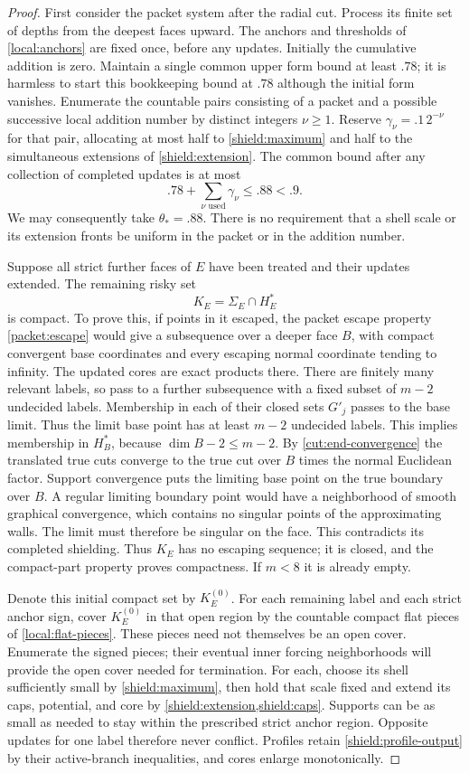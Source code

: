 \begin{proof}
First consider the packet system after the radial cut.  Process its
finite set of depths from the deepest faces upward.  The anchors and
thresholds of \cref{local:anchors} are fixed once, before any updates.
Initially the cumulative addition is zero.  Maintain a single common
upper form bound at least $.78$; it is harmless to start this bookkeeping
bound at $.78$ although the initial form vanishes.  Enumerate the
countable pairs consisting of a packet and a possible successive local
addition number by distinct integers $\nu\ge1$.  Reserve
$\gamma_\nu=.1\,2^{-\nu}$ for that pair, allocating at most half to
\cref{shield:maximum} and half to the simultaneous extensions of
\cref{shield:extension}.  The common bound after any collection of
completed updates is at most
\[
 .78+\sum_{\nu\text{ used}}\gamma_\nu\le .88<.9.
\]
We may consequently take $\theta_*=.88$.  There is no requirement
that a shell scale or its extension fronts be uniform in the packet
or in the addition number.

Suppose all strict further faces of $E$ have been treated and their
updates extended.  The remaining risky set
\[
 K_E=\Sigma_E\cap H_E^*
\]
is compact.  To prove this, if points in it escaped, the packet escape
property \cref{packet:escape} would give a subsequence over a deeper
face $B$, with compact convergent base coordinates and every escaping
normal coordinate tending to infinity.  The updated cores are exact
products there.  There are finitely many relevant labels, so pass to a further
subsequence with a fixed subset of $m-2$ undecided labels.
Membership in each of their closed sets $G'_j$ passes to the base
limit.  Thus the limit base point has at least $m-2$ undecided labels.
This implies membership in $H_B^*$, because
$\dim B-2\le m-2$.  By \cref{cut:end-convergence} the translated true
cuts converge to the true cut over $B$ times the normal Euclidean
factor.  Support convergence puts the limiting base point on the true
boundary over $B$.  A regular limiting boundary point would have a neighborhood
of smooth graphical convergence, which contains no singular points of
the approximating walls.  The limit must therefore be singular on the
face.  This contradicts its completed shielding.  Thus $K_E$ has no
escaping sequence; it is closed, and the compact-part property proves
compactness.  If $m<8$ it is already empty.

Denote this initial compact set by $K_E^{(0)}$.  For each remaining
label and each strict anchor sign, cover $K_E^{(0)}$ in that open
region by the countable compact flat pieces of \cref{local:flat-pieces}.
These pieces need not themselves be an open cover.  Enumerate the
signed pieces; their eventual inner forcing neighborhoods will provide
the open cover needed for termination.  For each,
choose its shell sufficiently small by \cref{shield:maximum}, then
hold that scale fixed and extend its caps, potential, and core by
\cref{shield:extension,shield:caps}.  Supports can be as small as needed
to stay within the prescribed strict anchor region.  Opposite updates
for one label therefore never conflict.  Profiles retain
\cref{shield:profile-output} by their active-branch inequalities, and
cores enlarge monotonically.


\end{proof}
